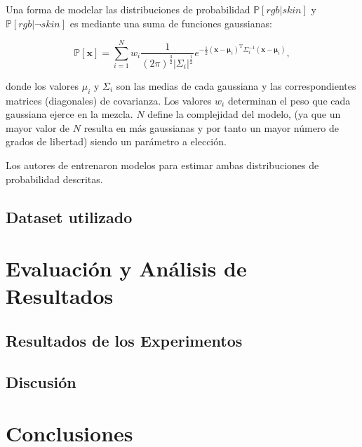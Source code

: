 \documentclass[12pt]{article}
\begin{document}
Una forma de modelar las distribuciones de probabilidad  $\mathbb{P} [ rgb|skin
]$ y $\mathbb{P} [ rgb | \neg skin ]$ es mediante una suma de funciones
gaussianas:

\begin{equation}
    \mathbb{P}[\mathbf{x}] = \sum\limits_{i=1}^N w_i
    \frac{1}{(2\pi)^{\frac{3}{2}} | \Sigma_i |^\frac{1}{2}} e^{-\frac{1}{2}
    (\mathbf{x} - \mathbf{\mu}_i)^{\text{T}} \Sigma_i ^{-1} (\mathbf{x} -
    \mathbf{\mu}_i)},
\end{equation}

donde los valores $\mu_i$ y $\Sigma_i$ son las medias de cada gaussiana y las
correspondientes matrices (diagonales) de covarianza. Los valores $w_i$
determinan el peso que cada gaussiana ejerce en la mezcla. $N$ define la
complejidad del modelo, (ya que un mayor valor de $N$ resulta en más gaussianas
y por tanto un mayor número de grados de libertad) siendo un parámetro a
elección.

Los autores de \cite{fef} entrenaron modelos para estimar ambas distribuciones
de probabilidad descritas.

\subsection{Dataset utilizado}

\section{Evaluación y Análisis de Resultados}

\subsection{Resultados de los Experimentos}

\subsection{Discusión}

\section{Conclusiones}





\end{document}
